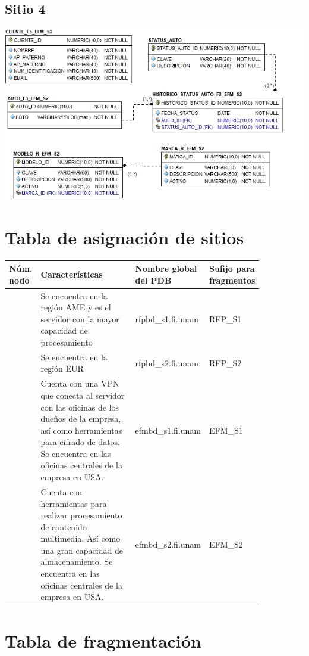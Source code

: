 \documentclass{article}
\begin{document}
\subsection*{Sitio 4}
\includegraphics[width=0.8\linewidth]{modelo-n4}

\section*{Tabla de asignación de sitios}

\newcommand{\nameTabBuilder}[1]{F\_RFP\_#1}
\newcommand{\snI}{RFP\_S1}
\newcommand{\snII}{RFP\_S2}
\newcommand{\snIII}{EFM\_S1}
\newcommand{\snIV}{EFM\_S2}
\newcommand{\pdbI}{rfpbd\_s1.fi.unam}
\newcommand{\pdbII}{rfpbd\_s2.fi.unam}
\newcommand{\pdbIII}{efmbd\_s1.fi.unam}
\newcommand{\pdbIV}{efmbd\_s2.fi.unam}

{
  \setlength\tabcolsep{3.5mm}
  \def\arraystretch{2}          %
  \begin{longtable}{
    |C{0.05\linewidth}
    |p{0.5\linewidth}
    |C{0.2\linewidth}
    |p{0.1\linewidth}|}
  \hline
  \textbf{Núm. nodo} &
  \textbf{Características} & 
  \textbf{Nombre global del PDB} & 
  \parbox[t]{2cm}{\centering \textbf{Sufijo para fragmentos}} 
  \\ \hline
    &
  Se encuentra en la región AME y es el servidor con la mayor capacidad 
  de procesamiento & 
 \pdbI & 
  \snI 
  \\ \hline
    &
  Se encuentra en la región EUR & 
  \pdbII & 
  \snII
  \\ \hline
    &
  Cuenta con una VPN que conecta al servidor con las oficinas de los dueños de 
  la empresa, así como herramientas para cifrado de datos. Se encuentra en las 
  oficinas centrales de la empresa en USA. & 
  \pdbIII & 
  \snIII
  \\ \hline
    &
  Cuenta con herramientas para realizar procesamiento de contenido multimedia. 
  Así como una gran capacidad de almacenamiento. Se encuentra en las oficinas 
  centrales de la empresa en USA. & 
  \pdbIV & 
  \snIV
  \\ \hline
  \end{longtable}
}

\section*{Tabla de fragmentación}


\end{document}
